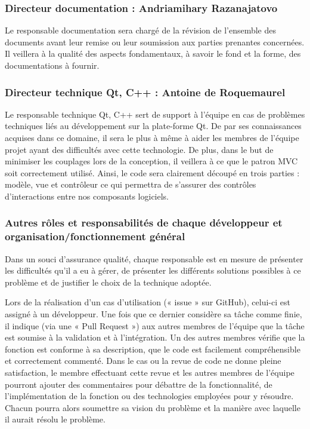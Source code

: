 \subsubsection{Directeur documentation : Andriamihary Razanajatovo}
Le responsable documentation sera chargé de la révision de l’ensemble des documents avant leur remise ou leur soumission aux parties prenantes
concernées. Il veillera à la qualité des aspects fondamentaux, à savoir le fond et la forme, des documentations à fournir.

\subsubsection{Directeur technique Qt, C++ : Antoine de Roquemaurel}
Le responsable technique Qt, C++ sert de support à l’équipe en cas de problèmes techniques liés au développement sur la plate-forme Qt. De par ses
connaissances acquises dans ce domaine, il sera le plus à même à aider les membres de l’équipe projet ayant des difficultés avec cette technologie.
De plus, dans le but de minimiser les couplages lors de la conception, il veillera à ce que le patron MVC soit correctement utilisé. Ainsi, le code
sera clairement découpé en trois parties : modèle, vue et contrôleur ce qui permettra de s’assurer des contrôles d'interactions entre nos composants
logiciels.

\subsubsection{Autres rôles et responsabilités de chaque développeur et organisation/fonctionnement général}
Dans un souci d’assurance qualité, chaque responsable est en mesure de présenter les difficultés qu’il a eu à gérer, de présenter les différents
solutions possibles à ce problème et de justifier le choix de la technique adoptée.

Lors de la réalisation d’un cas d’utilisation (« issue » sur GitHub), celui-ci est assigné à un développeur. Une fois que ce dernier considère sa
tâche comme finie, il indique (via une « Pull Request ») aux autres membres de l’équipe que la tâche est soumise à la validation et à l’intégration.
Un des autres membres vérifie que la fonction est conforme à sa description, que le code est facilement compréhensible et correctement commenté. Dans
le cas ou la revue de code ne donne pleine satisfaction, le membre effectuant cette revue et les autres membres de l’équipe pourront ajouter des
commentaires pour débattre de la fonctionnalité, de l’implémentation de la fonction ou des technologies employées pour y résoudre. Chacun pourra
alors soumettre sa vision du problème et la manière avec laquelle il aurait résolu le problème. 

